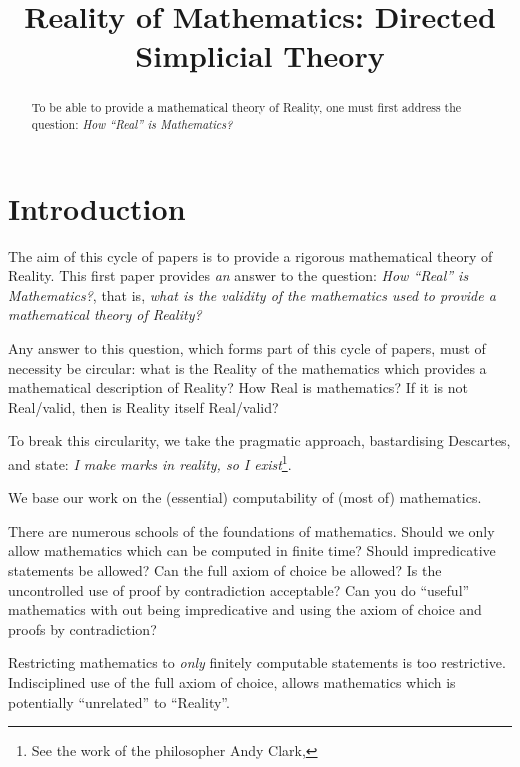 \documentclass[a4paper,openany]{amsbook}
\begin{document}
\frontmatter
\sloppy

\title[DiSimplicial Theory]{Reality of Mathematics: Directed Simplicial Theory}

%

\begin{abstract}
%
To be able to provide a mathematical theory of Reality, one must first 
address the question: \textit{How ``Real'' is Mathematics?}
%
\end{abstract} \maketitle \tableofcontents \mainmatter

\section{Introduction}

The aim of this cycle of papers is to provide a rigorous mathematical 
theory of Reality. This first paper provides \emph{an} answer to the 
question: \emph{How ``Real'' is Mathematics?}, that is, \emph{what is 
the validity of the mathematics used to provide a mathematical theory 
of Reality?}

Any answer to this question, which forms part of this cycle of papers, 
must of necessity be circular: what is the Reality of the mathematics 
which provides a mathematical description of Reality? How Real is 
mathematics? If it is not Real/valid, then is Reality itself 
Real/valid?

To break this circularity, we take the pragmatic approach, bastardising 
Descartes, and state: \emph{I make marks in reality, so I 
exist}\footnote{See the work of the philosopher Andy Clark, }.

We base our work on the (essential) computability of (most of) 
mathematics.

There are numerous schools of the foundations of mathematics.  Should 
we only allow mathematics which can be computed in finite time? Should 
impredicative statements be allowed? Can the full axiom of choice be 
allowed?  Is the uncontrolled use of proof by contradiction acceptable? 
Can you do ``useful'' mathematics with out being impredicative and 
using the axiom of choice and proofs by contradiction?

Restricting mathematics to \emph{only} finitely computable statements 
is too restrictive. Indisciplined use of the full axiom of choice, 
allows mathematics which is potentially ``unrelated'' to ``Reality''.
\end{document}
